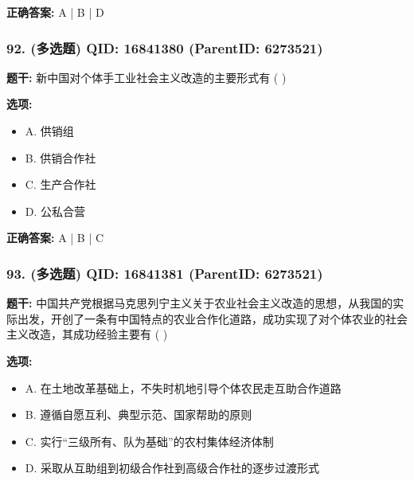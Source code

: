 \documentclass[12pt,UTF8]{ctexart}
\begin{document}
\textbf{正确答案:}
A | B | D

\vspace{0.3em}\hrulefill\vspace{0.7em}

\subsubsection*{92. (多选题) \small QID: 16841380 (ParentID: 6273521)}

\textbf{题干:}
新中国对个体手工业社会主义改造的主要形式有 ( )



\textbf{选项:}
\begin{itemize}[leftmargin=*]

  \item A. 供销组

  \item B. 供销合作社

  \item C. 生产合作社

  \item D. 公私合营

\end{itemize}

\textbf{正确答案:}
A | B | C

\vspace{0.3em}\hrulefill\vspace{0.7em}

\subsubsection*{93. (多选题) \small QID: 16841381 (ParentID: 6273521)}

\textbf{题干:}
中国共产党根据马克思列宁主义关于农业社会主义改造的思想，从我国的实际出发，开创了一条有中国特点的农业合作化道路，成功实现了对个体农业的社会主义改造，其成功经验主要有 ( )



\textbf{选项:}
\begin{itemize}[leftmargin=*]

  \item A. 在土地改革基础上，不失时机地引导个体农民走互助合作道路

  \item B. 遵循自愿互利、典型示范、国家帮助的原则

  \item C. 实行“三级所有、队为基础”的农村集体经济体制

  \item D. 采取从互助组到初级合作社到高级合作社的逐步过渡形式

\end{itemize}
\end{document}
